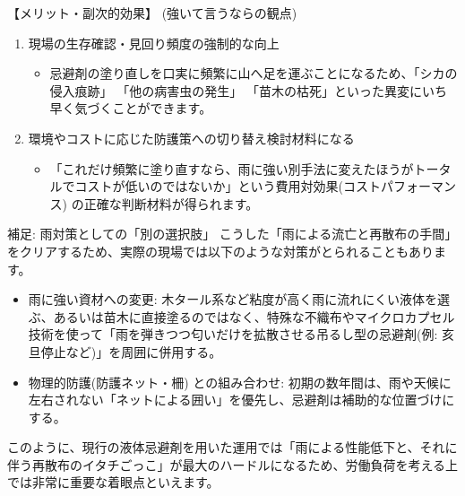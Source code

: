 \documentclass[a4paper, 11pt]{jsarticle}
\begin{document}
【メリット・副次的効果】 (強いて言うならの観点)
\begin{enumerate}
    \item 現場の生存確認・見回り頻度の強制的な向上
    \begin{itemize}
        \item[○] 忌避剤の塗り直しを口実に頻繁に山へ足を運ぶことになるため、「シカの侵入痕跡」 「他の病害虫の発生」 「苗木の枯死」といった異変にいち早く気づくことができます。
    \end{itemize}
    \item 環境やコストに応じた防護策への切り替え検討材料になる
    \begin{itemize}
        \item[○] 「これだけ頻繁に塗り直すなら、雨に強い別手法に変えたほうがトータルでコストが低いのではないか」という費用対効果(コストパフォーマンス) の正確な判断材料が得られます。
    \end{itemize}
\end{enumerate}
補足: 雨対策としての「別の選択肢」
こうした「雨による流亡と再散布の手間」をクリアするため、実際の現場では以下のような対策がとられることもあります。
\begin{itemize}
    \item 雨に強い資材への変更: 木タール系など粘度が高く雨に流れにくい液体を選ぶ、あるいは苗木に直接塗るのではなく、特殊な不織布やマイクロカプセル技術を使って「雨を弾きつつ匂いだけを拡散させる吊るし型の忌避剤(例: 亥旦停止など)」を周囲に併用する\cite{ref19}。
    \item 物理的防護(防護ネット・柵) との組み合わせ: 初期の数年間は、雨や天候に左右されない「ネットによる囲い」を優先し、忌避剤は補助的な位置づけにする。
\end{itemize}
このように、現行の液体忌避剤を用いた運用では「雨による性能低下と、それに伴う再散布のイタチごっこ」が最大のハードルになるため、労働負荷を考える上では非常に重要な着眼点といえます。
\end{document}
